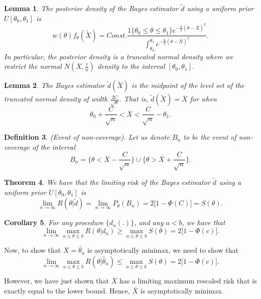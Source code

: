 \documentclass[twoside]{article}
\newcounter{lecnum}
\newtheorem{theorem}{Theorem}[lecnum]
\newtheorem{lemma}[theorem]{Lemma}
\newtheorem{corollary}[theorem]{Corollary}
\newtheorem{definition}[theorem]{Definition}
\begin{document}
\begin{lemma}The posterior density of the Bayes estimator $\tilde{d}$ using a uniform prior $U[\theta_0, \theta_1]$ is 
$$
w(\theta)f_{\theta}(\tilde{X}) = Const.\frac{1\{\theta_0 \leq \theta \leq \theta_1\}e^{-\frac{n}{2}(\theta - \overline{X})^2}}{\int_{\theta_{0}}^{\theta_{1}}e^{-\frac{n}{2}(\theta - \overline{X})^2}}.
$$
In particular, the posterior density is a truncated normal density where we restrict the normal $N(\overline{X}, \frac{1}{n})$ density to the interval $[\theta_0, \theta_1].$
\end{lemma}

\begin{lemma}The Bayes estimator $\tilde{d}(\tilde{X})$ is the midpoint of the level set of the truncated normal density of width $\frac{2C}{\sqrt{n}}.$ That is, $\tilde{d}(\tilde{X}) = \overline{X}$ for when 
$$
\theta_0 + \frac{C}{\sqrt{n}} < \overline{X} < \frac{C}{\sqrt{n}} - \theta_1.
$$
\end{lemma}

\begin{definition}(Event of non-coverage). Let us denote $B_n$ to be the event of non-coverage of the interval 
$$
B_n = \{\theta < \overline{X} - \frac{C}{\sqrt{n}}\} \cup \{\theta > \overline{X} + \frac{C}{\sqrt{n}}\}.
$$
\end{definition}
\begin{theorem}We have that the limiting risk of the Bayes estimator $\tilde{d}$ using a uniform prior $U[\theta_0, \theta_1]$ is 
$$
\lim_{n \rightarrow \infty}R(\theta|\tilde{d}) = \lim_{n \rightarrow \infty}P_{\theta}(B_n) = 2\bigg[1 - \Phi(C) \bigg] = S(\theta).
$$
\end{theorem}

\begin{corollary}For any procedure $\{d_n(.)\}$, and any $a < b$, we have that 
$$
\lim_{n \rightarrow \infty}\max_{a \leq \theta \leq b}R(\theta|d_n) \geq \max_{a \leq \theta \leq b}S(\theta) = 2\bigg[1 - \Phi(c) \bigg].
$$
\end{corollary}

Now, to show that $\overline{X} = \hat{\theta}_n$ is asymptotically minimax, we need to show that 
$$
\lim_{n \rightarrow \infty}\max_{a \leq \theta \leq b}R(\theta|\hat{\theta}_n) \leq \max_{a \leq \theta \leq b}S(\theta) = 2\bigg[1 - \Phi(c) \bigg].
$$

However, we have just shown that $\overline{X}$ has a limiting maximum rescaled risk that is exactly equal to the lower bound. Hence, $\overline{X}$ is asymptotically minimax.\\
\end{document}
